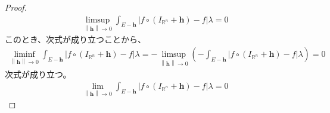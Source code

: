 \documentclass[dvipdfmx]{jsarticle}
\begin{document}
\begin{proof}
\begin{align*}
\limsup_{\left\| \mathbf{h} \right\| \rightarrow 0}{\int_{E - \mathbf{h}} {\left| f \circ \left( I_{\mathbb{R}^{n}} + \mathbf{h} \right) - f \right|\lambda}} = 0
\end{align*}
このとき、次式が成り立つことから、
\begin{align*}
\liminf_{\left\| \mathbf{h} \right\| \rightarrow 0}{\int_{E - \mathbf{h}} {\left| f \circ \left( I_{\mathbb{R}^{n}} + \mathbf{h} \right) - f \right|\lambda}} = - \limsup_{\left\| \mathbf{h} \right\| \rightarrow 0}\left( - \int_{E - \mathbf{h}} {\left| f \circ \left( I_{\mathbb{R}^{n}} + \mathbf{h} \right) - f \right|\lambda} \right) = 0
\end{align*}
次式が成り立つ。
\begin{align*}
\lim_{\left\| \mathbf{h} \right\| \rightarrow 0}{\int_{E - \mathbf{h}} {\left| f \circ \left( I_{\mathbb{R}^{n}} + \mathbf{h} \right) - f \right|\lambda}} = 0
\end{align*}
\end{proof}
\end{document}
